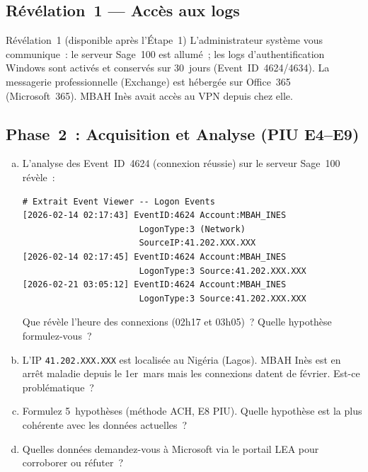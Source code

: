 \subsection{Révélation~1 --- Accès aux logs}

\begin{boiteRemarque}{Révélation~1 (disponible après l'Étape~1)}
L'administrateur système vous communique~: le serveur Sage~100 est
allumé~; les logs d'authentification Windows sont activés et conservés
sur 30~jours (Event~ID~4624/4634). La messagerie professionnelle
(Exchange) est hébergée sur Office~365 (Microsoft~365). MBAH Inès
avait accès au VPN depuis chez elle.
\end{boiteRemarque}

\subsection{Phase~2~: Acquisition et Analyse (PIU E4--E9)}

\begin{boxexo}[title={\ding{45}\quad FAKO --- Étape~2~: Investigation système}]
\begin{enumerate}[(a)]
    \item L'analyse des Event~ID~4624 (connexion réussie) sur le serveur
          Sage~100 révèle~:
\begin{lstlisting}[language=bash_forensique]
# Extrait Event Viewer -- Logon Events
[2026-02-14 02:17:43] EventID:4624 Account:MBAH_INES
                       LogonType:3 (Network)
                       SourceIP:41.202.XXX.XXX
[2026-02-14 02:17:45] EventID:4624 Account:MBAH_INES
                       LogonType:3 Source:41.202.XXX.XXX
[2026-02-21 03:05:12] EventID:4624 Account:MBAH_INES
                       LogonType:3 Source:41.202.XXX.XXX
\end{lstlisting}
          Que révèle l'heure des connexions (02h17 et 03h05)~?
          Quelle hypothèse formulez-vous~?
    \item L'IP \texttt{41.202.XXX.XXX} est localisée au Nigéria
          (Lagos). MBAH Inès est en arrêt maladie depuis le 1er~mars
          mais les connexions datent de février. Est-ce problématique~?
    \item Formulez 5~hypothèses (méthode ACH, E8 PIU). Quelle hypothèse
          est la plus cohérente avec les données actuelles~?
    \item Quelles données demandez-vous à Microsoft via le portail
          LEA pour corroborer ou réfuter~?
\end{enumerate}
\end{boxexo}

